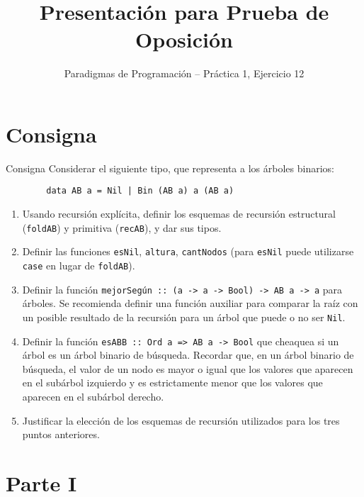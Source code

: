 \documentclass[8pt]{beamer}
\title{Presentación para Prueba de Oposición}
\subtitle{Paradigmas de Programación -- Práctica 1, Ejercicio 12}
\begin{document}
\newcommand{\code}[1]{\texttt{#1}}

\begin{frame}
    \titlepage
\end{frame}

\section{Consigna}

\begin{frame}[fragile]{Consigna}
    Considerar el siguiente tipo, que representa a los árboles binarios:
    \begin{verbatim}
        data AB a = Nil | Bin (AB a) a (AB a)
    \end{verbatim}

    \begin{enumerate}[I]
        \item<2-> Usando recursión explícita, definir los esquemas de recursión estructural (\code{foldAB}) y primitiva (\code{recAB}), y dar sus tipos.
        \item<3-> Definir las funciones \code{esNil}, \code{altura}, \code{cantNodos} (para \code{esNil} puede utilizarse \code{case} en lugar de \code{foldAB}).
        \item<4-> Definir la función \code{mejorSegún :: (a -> a -> Bool) -> AB a -> a} para árboles. Se recomienda definir una función auxiliar para comparar la raíz con un posible resultado de la recursión para un árbol que puede o no ser \code{Nil}.
        \item<5-> Definir la función \code{esABB :: Ord a => AB a -> Bool} que cheaquea si un árbol es un árbol binario de búsqueda. Recordar que, en un árbol binario de búsqueda, el valor de un nodo es mayor o igual que los valores que aparecen en el subárbol izquierdo y es estrictamente menor que los valores que aparecen en el subárbol derecho.
        \item<6-> Justificar la elección de los esquemas de recursión utilizados para los tres puntos anteriores.
    \end{enumerate}

\end{frame}

\section{Parte I}
\end{document}
